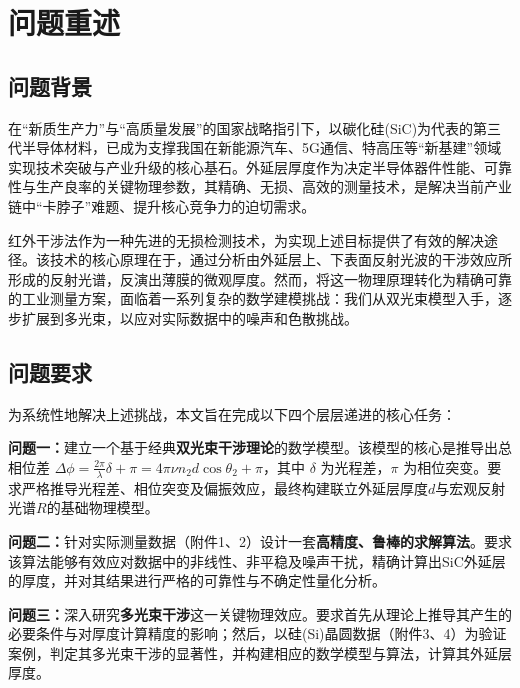 \documentclass[withoutpreface,bwprint]{cumcmthesis} %
\begin{document}
\section{问题重述}

\subsection{问题背景}
在“新质生产力”与“高质量发展”的国家战略指引下，以碳化硅(SiC)为代表的第三代半导体材料，已成为支撑我国在新能源汽车、5G通信、特高压等“新基建”领域实现技术突破与产业升级的核心基石。外延层厚度作为决定半导体器件性能、可靠性与生产良率的关键物理参数，其精确、无损、高效的测量技术，是解决当前产业链中“卡脖子”难题、提升核心竞争力的迫切需求。

红外干涉法作为一种先进的无损检测技术，为实现上述目标提供了有效的解决途径。该技术的核心原理在于，通过分析由外延层上、下表面反射光波的干涉效应所形成的反射光谱，反演出薄膜的微观厚度。然而，将这一物理原理转化为精确可靠的工业测量方案，面临着一系列复杂的数学建模挑战：我们从双光束模型入手，逐步扩展到多光束，以应对实际数据中的噪声和色散挑战。

\subsection{问题要求}
为系统性地解决上述挑战，本文旨在完成以下四个层层递进的核心任务：

\vspace{0.5em} %
\noindent %
\noindent\textbf{问题一：}建立一个基于经典\textbf{双光束干涉理论}的数学模型。该模型的核心是推导出总相位差 $\Delta\phi = \frac{2\pi}{\lambda}\delta + \pi = 4\pi\nu n_2 d \cos\theta_2 + \pi$，其中 $\delta$ 为光程差，$\pi$ 为相位突变。要求严格推导光程差、相位突变及偏振效应，最终构建联立外延层厚度$d$与宏观反射光谱$R$的基础物理模型。
                   
\vspace{0.5em} %
\noindent
\textbf{问题二：}针对实际测量数据（附件1、2）设计一套\textbf{高精度、鲁棒的求解算法}。要求该算法能够有效应对数据中的非线性、非平稳及噪声干扰，精确计算出SiC外延层的厚度，并对其结果进行严格的可靠性与不确定性量化分析。

\vspace{0.5em}                                       
\noindent
\textbf{问题三：}深入研究\textbf{多光束干涉}这一关键物理效应。要求首先从理论上推导其产生的必要条件与对厚度计算精度的影响；然后，以硅(Si)晶圆数据（附件3、4）为验证案例，判定其多光束干涉的显著性，并构建相应的数学模型与算法，计算其外延层厚度。
\end{document}

